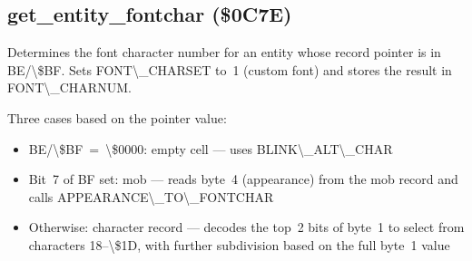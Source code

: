 \documentclass[10pt]{report}
\begin{document}
\nwendcode{}\nwdocspar

\subsection{get\_entity\_fontchar (\$0C7E)}

Determines the font character number for an entity whose record pointer
is in {\Tt{}{\textbackslash}{\$}BE/{\textbackslash}{\$}BF\nwendquote}.  Sets {\Tt{}FONT{\textbackslash}{\_}CHARSET\nwendquote} to~1 (custom font) and
stores the result in {\Tt{}FONT{\textbackslash}{\_}CHARNUM\nwendquote}.

Three cases based on the pointer value:
\begin{itemize}
\item {\Tt{}{\textbackslash}{\$}BE/{\textbackslash}{\$}BF\ =\ {\textbackslash}{\$}0000\nwendquote}: empty cell --- uses {\Tt{}BLINK{\textbackslash}{\_}ALT{\textbackslash}{\_}CHAR\nwendquote}
\item Bit~7 of {\Tt{}{\textbackslash}{\$}BF\nwendquote} set: mob --- reads byte~4 (appearance) from the
      mob record and calls {\Tt{}APPEARANCE{\textbackslash}{\_}TO{\textbackslash}{\_}FONTCHAR\nwendquote}
\item Otherwise: character record --- decodes the top~2 bits of byte~1
      to select from characters {\Tt{}{\textbackslash}{\$}18--{\textbackslash}{\$}1D\nwendquote}, with further subdivision
      based on the full byte~1 value
\end{itemize}
\end{document}
